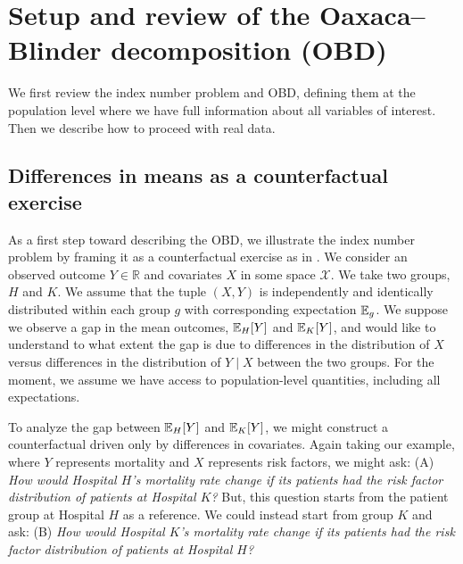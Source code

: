 \section{Setup and review of the Oaxaca--Blinder decomposition (OBD)}
\label{sec:counterfactual_OBD}

We first review the index number problem and OBD, defining them at the population level where we have full information about all variables of interest.
Then we describe how to proceed with real data.


\subsection{Differences in means as a counterfactual exercise} 
\label{sec:counterfactual_example}

As a first step toward describing the OBD, we illustrate the index number problem by framing it as a counterfactual exercise as in \citet{fortinLemieuxFirpo2011}.
We consider an observed outcome $Y \in \mathbb{R}$ and covariates $X$ in some space $\mathcal{X}$. We take two groups, $H$ and $K$. We assume that the tuple $(X,Y)$ is independently and identically distributed within each group $g$ with corresponding expectation $\mathbb{E}_g$. We suppose we observe a gap in the mean outcomes, $\mathbb{E}_H[Y]$ and $\mathbb{E}_K[Y]$, and would like to understand to what extent the gap is due to differences in the distribution of $X$ versus differences in the distribution of $Y\mid X$ between the two groups. 
For the moment, we assume we have access to population-level quantities, including all expectations.

To analyze the gap between $\mathbb{E}_H[Y]$ and $\mathbb{E}_K[Y]$, we might construct a counterfactual driven only by differences in covariates.
Again taking our example, where $Y$ represents mortality and $X$ represents risk factors, we might ask:
(A) \emph{How would Hospital $H$'s mortality rate change if its patients had the risk factor distribution of patients at Hospital $K$?}
But, this question starts from the patient group at Hospital $H$ as a reference. We could instead start from group $K$ and ask:
(B) \emph{How would Hospital $K$'s mortality rate change if its patients had the risk factor distribution of patients at Hospital $H$?}

